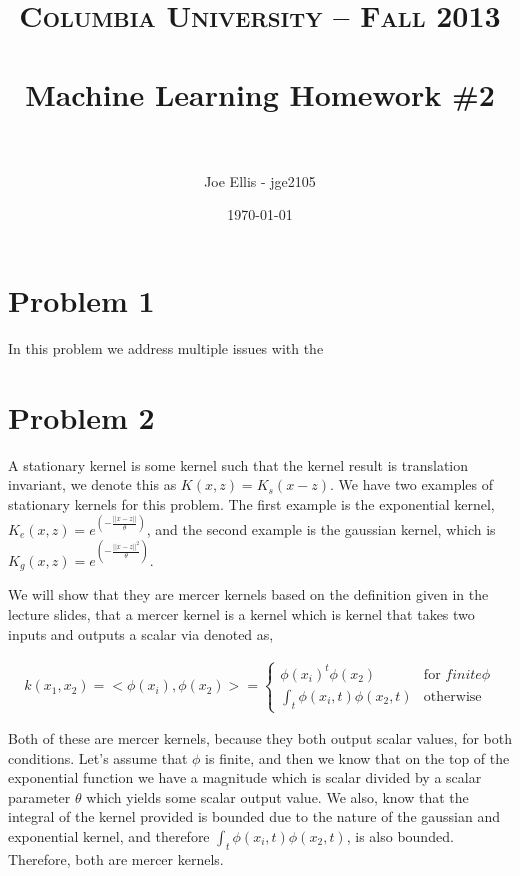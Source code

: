 \documentclass[paper=a4, fontsize=11pt]{scrartcl} %
\title{	
\normalfont \normalsize 
\textsc{Columbia University -- Fall 2013} \\ [25pt] %
\horrule{0.5pt} \\[0.4cm] %
\huge Machine Learning Homework \#2\\ %
\horrule{2pt} \\[0.5cm] %
}
\author{Joe Ellis - jge2105} %
\date{\normalsize\today} %
\begin{document}
\maketitle %


\section{Problem 1}

In this problem we address multiple issues with the 

\section{Problem 2}

A stationary kernel is some kernel such that the kernel result is translation invariant, we denote this as $K(x,z) = K_s(x-z)$.  We have two examples of stationary kernels for this problem.  The first example is the exponential kernel, $K_e(x,z) = e^{(-\frac{||x-z||}{\theta})}$, and the second example is the gaussian kernel, which is $K_g(x,z) = e^{(-\frac{||x-z||^2}{\theta})}$.

We will show that they are mercer kernels based on the definition given in the lecture slides, that a mercer kernel is a kernel which is kernel that takes two inputs and outputs a scalar via denoted as,

\begin{align}
k(x_1,x_2) = <\phi(x_i),\phi(x_2)> = \left\{
	\begin{array}{ll}
		\phi(x_i)^t\phi(x_2) & \mbox{for } finite \phi \\
		\int_t \phi(x_i,t)\phi(x_2,t) & \mbox{otherwise} 
	\end{array}
\right.
\end{align} 

Both of these are mercer kernels, because they both output scalar values, for both conditions.
Let's assume that $\phi$ is finite, and then we know that on the top of the exponential function we have a magnitude which is scalar divided by a scalar parameter $\theta$ which yields some scalar output value.
We also, know that the integral of the kernel provided is bounded due to the nature of the gaussian and exponential kernel, and therefore $\int_t \phi(x_i,t)\phi(x_2,t)$, is also bounded.  Therefore, both are mercer kernels.
\end{document}
